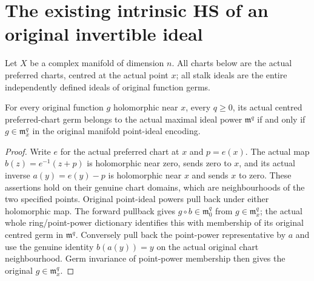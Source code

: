 \section{The existing intrinsic HS of an original invertible ideal}

Let $X$ be a complex manifold of dimension $n$. All charts below are the
actual preferred charts, centred at the actual point $x$; all stalk ideals
are the entire independently defined ideals of original function germs.

\begin{lemma}
\label{hir:actual-centred-chart-original-point-power-dictionary}
\leanok
{}
For every original function $g$ holomorphic near $x$, every $q\ge0$, its
actual centred preferred-chart germ belongs to the actual maximal ideal
power $\mathfrak m^q$ if and only if
$g\in\mathfrak m_x^q$ in the original manifold point-ideal encoding.
\end{lemma}
\begin{proof}
Write $e$ for the actual preferred chart at $x$ and $p=e(x)$. The actual
map $b(z)=e^{-1}(z+p)$ is holomorphic near zero, sends zero to $x$, and
its actual inverse $a(y)=e(y)-p$ is holomorphic near $x$ and sends $x$ to
zero. These assertions hold on their genuine chart domains, which are
neighbourhoods of the two specified points. Original point-ideal powers
pull back under either holomorphic map. The forward pullback gives
$g\circ b\in\mathfrak m_0^q$ from $g\in\mathfrak m_x^q$; the actual
whole ring/point-power dictionary identifies this with membership of its
original centred germ in $\mathfrak m^q$. Conversely pull back the
point-power representative by $a$ and use the genuine identity
$b(a(y))=y$ on the actual original chart neighbourhood. Germ invariance
of point-power membership then gives the original $g\in\mathfrak m_x^q$.
\end{proof}

